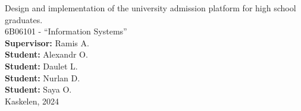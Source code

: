 \begin{center}
\vspace{2cm}
\large
\textbf{\mytitle}
\par
\vspace{0.5cm}
\normalsize Design and implementation of the university admission platform for high school graduates.\\
    \vspace{1cm}
    6B06101 - ``Information Systems''\\
    \vspace{1cm} 
    \textbf{Supervisor:}\raggedleft \hspace{5cm} Ramis A.\\
    \vspace{0.5cm}
    \textbf{Student:}\raggedleft \hspace{4.4cm} Alexandr O.\\
    \vspace{0.5cm}
    \textbf{Student:}\raggedleft \hspace{5cm} Daulet L.\\ 
    \vspace{0.5cm}
    \textbf{Student:}\raggedleft \hspace{4.9cm} Nurlan D.\\ 
    \vspace{0.5cm}
    \textbf{Student:}\raggedleft \hspace{5.3cm} Saya O.\\ 
    
\vfill
Kaskelen, 2024 \centering
\end{center}